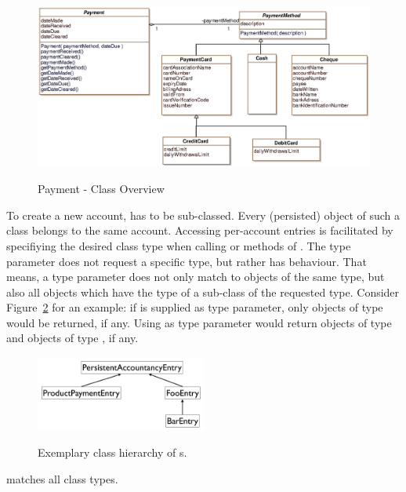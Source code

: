 \begin{figure}
\centering
  \includegraphics[width=1.0\textwidth]{images/Payment_Overview.eps}
	\label{payment_overview}
	\caption{Payment - Class Overview}
\end{figure}

To create a new account,  has to be sub-classed.
Every (persisted) object of such a class belongs to the same account.
Accessing per-account entries is facilitated by specifiying the desired class type when calling  or  methods of .
The type parameter does not request a specific type, but rather has  behaviour.
That means, a type parameter does not only match to objects of the same type, but also all objects which have the type of a sub-class of the requested type.
Consider Figure~\ref{matches} for an example: if  is supplied as type parameter, only objects of type  would be returned, if any.
Using  as type parameter would return objects of type  and objects of type , if any.
\begin{figure}
	\centering
  \includegraphics[width=0.5\textwidth]{images/type_matches.pdf}
	\label{matches}
	\caption{Exemplary class hierarchy of s.}
\end{figure}
 matches all class types.
	

